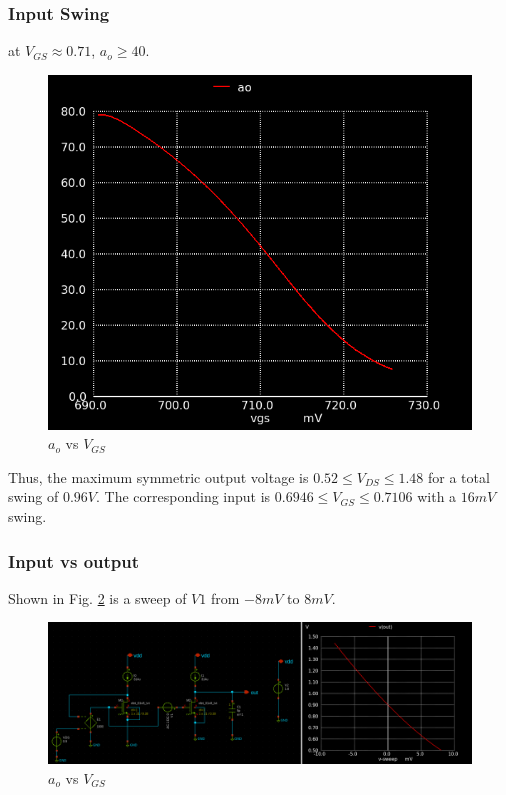 \documentclass[conference]{IEEEtran}
\begin{document}
\subsubsection{Input Swing}
at $V_{GS}\approx 0.71$, $a_o \geq 40$. 
\begin{figure}[H]
	\centering 
	\includegraphics[scale=0.3]{ao-vgs.png}
	\caption{$a_o$ vs $V_{GS}$}
	\label{swing-in}
\end{figure}
Thus, the maximum symmetric output voltage is $0.52 \leq V_{DS} \leq 1.48$ for a total swing of $0.96V$. The corresponding input is $0.6946 \leq V_{GS} \leq 0.7106$ with a $16mV$ swing.
\vspace{8pt}
\subsubsection{Input vs output}
Shown in Fig. \ref{vinvout-1} is a sweep of $V1$ from $-8mV$ to $8mV$. 
\begin{figure}[H]
	\centering 
	\includegraphics[width=\columnwidth]{v1-sweep-1.png}
	\caption{$a_o$ vs $V_{GS}$}
	\label{vinvout-1}
\end{figure}
\end{document}
